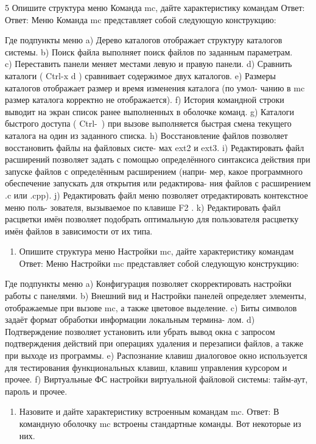 \documentclass[
  english,
  russian,
  12pt,
  a4paper,
  DIV=11,
  numbers=noendperiod]{scrreprt}
\providecommand{\tightlist}{%
  \setlength{\itemsep}{0pt}\setlength{\parskip}{0pt}}
\begin{document}
5 Опишите структура меню Команда mc, дайте характеристику командам
Ответ: Ответ: Меню Команда mc представляет собой следующую конструкцию:

Где подпункты меню a) Дерево каталогов отображает структуру каталогов
системы. b) Поиск файла выполняет поиск файлов по заданным параметрам.\\
c) Переставить панели меняет местами левую и правую панели. d) Сравнить
каталоги ( Ctrl-x d ) сравнивает содержимое двух каталогов. e) Размеры
каталогов отображает размер и время изменения каталога (по умол- чанию в
mc размер каталога корректно не отображается). f) История командной
строки выводит на экран список ранее выполненных в оболочке команд. g)
Каталоги быстрого доступа ( Ctrl-~) при вызове выполняется быстрая смена
текущего каталога на один из заданного списка. h) Восстановление файлов
позволяет восстановить файлы на файловых систе- мах ext2 и ext3. i)
Редактировать файл расширений позволяет задать с помощью определённого
синтаксиса действия при запуске файлов с определённым расширением
(напри- мер, какое программного обеспечение запускать для открытия или
редактирова- ния файлов с расширением .c или .cpp). j) Редактировать
файл меню позволяет отредактировать контекстное меню поль- зователя,
вызываемое по клавише F2 . k) Редактировать файл расцветки имён
позволяет подобрать оптимальную для пользователя расцветку имён файлов в
зависимости от их типа.

\begin{enumerate}
\def\labelenumi{\arabic{enumi}.}
\setcounter{enumi}{5}
\tightlist
\item
  Опишите структура меню Настройки mc, дайте характеристику командам
  Ответ: Меню Настройки mc представляет собой следующую конструкцию:
\end{enumerate}

Где подпункты меню a) Конфигурация позволяет скорректировать настройки
работы с панелями. b) Внешний вид и Настройки панелей определяет
элементы, отображаемые при вызове mc, а также цветовое выделение. c)
Биты символов задаёт формат обработки информации локальным термина- лом.
d) Подтверждение позволяет установить или убрать вывод окна с запросом
подтверждения действий при операциях удаления и перезаписи файлов, а
также при выходе из программы. e) Распознание клавиш диалоговое окно
используется для тестирования функциональных клавиш, клавиш управления
курсором и прочее. f) Виртуальные ФС настройки виртуальной файловой
системы: тайм-аут, пароль и прочее.

\begin{enumerate}
\def\labelenumi{\arabic{enumi}.}
\setcounter{enumi}{6}
\tightlist
\item
  Назовите и дайте характеристику встроенным командам mc. Ответ: В
  командную оболочку mc встроены стандартные команды. Вот некоторые из
  них.
\end{enumerate}
\end{document}
